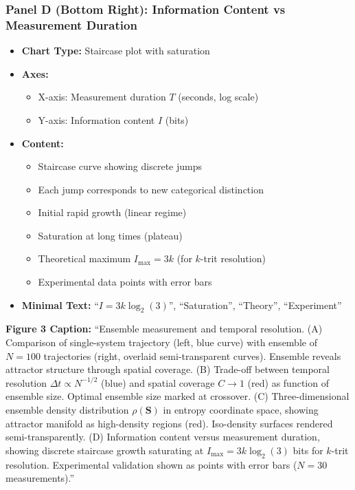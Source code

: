 \subsubsection*{Panel D (Bottom Right): Information Content vs Measurement Duration}
\begin{itemize}
\item \textbf{Chart Type:} Staircase plot with saturation
\item \textbf{Axes:}
  \begin{itemize}
  \item X-axis: Measurement duration $T$ (seconds, log scale)
  \item Y-axis: Information content $I$ (bits)
  \end{itemize}
\item \textbf{Content:}
  \begin{itemize}
  \item Staircase curve showing discrete jumps
  \item Each jump corresponds to new categorical distinction
  \item Initial rapid growth (linear regime)
  \item Saturation at long times (plateau)
  \item Theoretical maximum $I_{\max} = 3k$ (for $k$-trit resolution)
  \item Experimental data points with error bars
  \end{itemize}
\item \textbf{Minimal Text:} ``$I = 3k \log_2(3)$'', ``Saturation'', ``Theory'', ``Experiment''
\end{itemize}

\textbf{Figure 3 Caption:}
``Ensemble measurement and temporal resolution. (A) Comparison of single-system trajectory (left, blue curve) with ensemble of $N=100$ trajectories (right, overlaid semi-transparent curves). Ensemble reveals attractor structure through spatial coverage. (B) Trade-off between temporal resolution $\Delta t\propto N^{-1/2}$ (blue) and spatial coverage $C\to 1$ (red) as function of ensemble size. Optimal ensemble size marked at crossover. (C) Three-dimensional ensemble density distribution $\rho(\mathbf{S})$ in entropy coordinate space, showing attractor manifold as high-density regions (red). Iso-density surfaces rendered semi-transparently. (D) Information content versus measurement duration, showing discrete staircase growth saturating at $I_{\max}=3k \log_2(3)$ bits for $k$-trit resolution. Experimental validation shown as points with error bars ($N=30$ measurements).''

